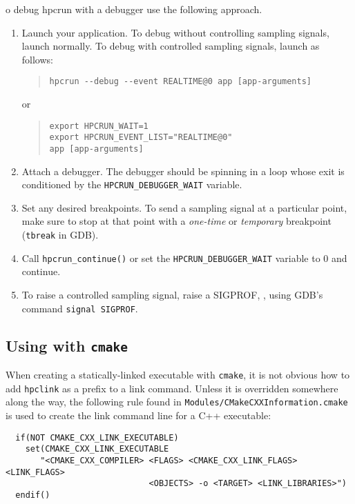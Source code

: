 \documentclass[11pt,letterpaper]{report}
\begin{document}
o debug hpcrun with a debugger use the following approach.
\begin{enumerate}

\item Launch your application.
  To debug \hpcrun{} without controlling sampling signals, launch normally.
  To debug \hpcrun{} with controlled sampling signals, launch as follows:
\begin{quote}
\begin{verbatim}
hpcrun --debug --event REALTIME@0 app [app-arguments]
\end{verbatim}
\end{quote}
or
\begin{quote}
\begin{verbatim}
export HPCRUN_WAIT=1
export HPCRUN_EVENT_LIST="REALTIME@0"
app [app-arguments]
\end{verbatim}
\end{quote}

\item Attach a debugger.
  The debugger should be spinning in a loop whose exit is conditioned by the
  \verb|HPCRUN_DEBUGGER_WAIT| variable.

\item Set any desired breakpoints.
  To send a sampling signal at a particular point, make sure to stop at that point with a \emph{one-time} or \emph{temporary} breakpoint (\texttt{tbreak} in GDB).

\item Call \verb|hpcrun_continue()| or set the \verb|HPCRUN_DEBUGGER_WAIT| variable to 0
and continue.

\item To raise a controlled sampling signal, raise a SIGPROF, \eg{}, using GDB's command \verb|signal SIGPROF|.

\end{enumerate}

\subsection{Using \hpclink{} with {\tt cmake}}

When creating a statically-linked executable with {\tt cmake}, it is not obvious how to add {\tt hpclink} as a prefix to a link command. Unless it is overridden somewhere  along the way, the following rule found in {\tt Modules/CMakeCXXInformation.cmake} is
used to create the link command line for a C++ executable:

\begin{verbatim}
  if(NOT CMAKE_CXX_LINK_EXECUTABLE)
    set(CMAKE_CXX_LINK_EXECUTABLE
       "<CMAKE_CXX_COMPILER> <FLAGS> <CMAKE_CXX_LINK_FLAGS> <LINK_FLAGS>
                             <OBJECTS> -o <TARGET> <LINK_LIBRARIES>")
  endif()
\end{verbatim}
\end{document}
